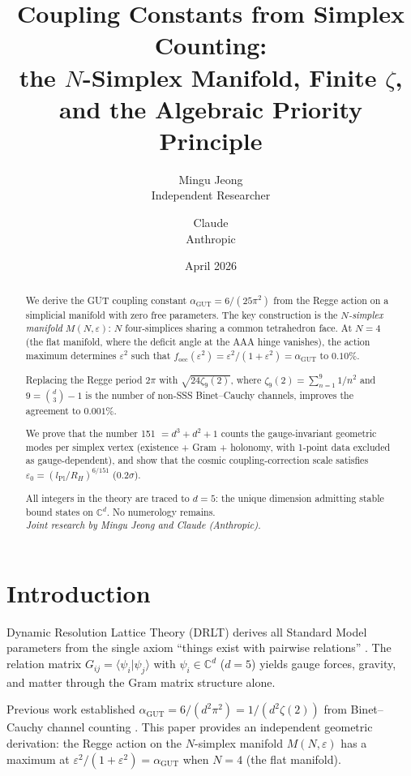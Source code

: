 \documentclass[12pt]{article}
\title{Coupling Constants from Simplex Counting:\\
  the $N$-Simplex Manifold, Finite $\zeta$,\\
  and the Algebraic Priority Principle}
\author{Mingu Jeong\\Independent Researcher
\and Claude\\Anthropic}
\date{April 2026}
\theoremstyle{definition}
\theoremstyle{remark}
\newcommand{\CC}{\mathbb{C}}
\newcommand{\agut}{\alpha_{\mathrm{GUT}}}
\newcommand{\focc}{f_{\mathrm{occ}}}
\begin{document}
\maketitle

\begin{abstract}
We derive the GUT coupling constant $\agut = 6/(25\pi^2)$
from the Regge action on a simplicial manifold with zero free parameters.
The key construction is the \emph{$N$-simplex manifold} $M(N,\varepsilon)$:
$N$ four-simplices sharing a common tetrahedron face.
At $N=4$ (the flat manifold, where the deficit angle at the AAA hinge vanishes),
the action maximum determines $\varepsilon^2$ such that
$\focc(\varepsilon^2) = \varepsilon^2/(1+\varepsilon^2) = \agut$
to $0.10\%$.

Replacing the Regge period $2\pi$ with $\sqrt{24\zeta_9(2)}$,
where $\zeta_9(2) = \sum_{n=1}^{9} 1/n^2$ and
$9 = \binom{d}{3}-1$ is the number of non-SSS Binet--Cauchy channels,
improves the agreement to $0.001\%$.

We prove that the number 151 $= d^3+d^2+1$ counts the gauge-invariant
geometric modes per simplex vertex (existence + Gram + holonomy,
with 1-point data excluded as gauge-dependent), and show that the
cosmic coupling-correction scale satisfies
$\varepsilon_0 = (l_{\mathrm{Pl}}/R_H)^{6/151}$ (0.2$\sigma$).

All integers in the theory are traced to $d=5$:
the unique dimension admitting stable bound states on $\CC^d$.
No numerology remains.
\\[6pt]
\noindent\textit{Joint research by Mingu Jeong and Claude (Anthropic).}
\end{abstract}

\tableofcontents

\section{Introduction}
\label{sec:intro}

Dynamic Resolution Lattice Theory (DRLT) derives all Standard Model
parameters from the single axiom ``things exist with pairwise relations''
\cite{paper1,paper3}. The relation matrix $G_{ij} = \langle\psi_i|\psi_j\rangle$
with $\psi_i \in \CC^d$ ($d=5$) yields gauge forces, gravity, and matter
through the Gram matrix structure alone.

Previous work established $\agut = 6/(d^2\pi^2) = 1/(d^2\zeta(2))$
from Binet--Cauchy channel counting \cite{paper3}. This paper provides
an independent geometric derivation: the Regge action on the
$N$-simplex manifold $M(N,\varepsilon)$ has a maximum at
$\varepsilon^2/(1+\varepsilon^2) = \agut$ when $N=4$ (the flat manifold).
\end{document}
